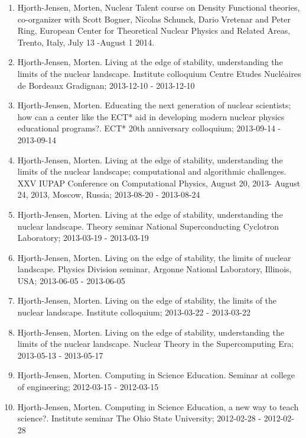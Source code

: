 \documentclass[%
oneside,                 %
final,                   %
10pt]{article}
\begin{document}
\begin{enumerate}
\item Hjorth-Jensen, Morten, Nuclear Talent course on Density Functional theories, co-organizer with Scott Bogner, Nicolas Schunck, Dario Vretenar and Peter Ring, European Center for Theoretical Nuclear Physics and Related Areas, Trento, Italy, July 13 -August 1 2014.

\item Hjorth-Jensen, Morten.  Living at the edge of stability, understanding the limits of the nuclear landscape. Institute colloquium Centre Etudes Nucléaires de Bordeaux Gradignan; 2013-12-10 - 2013-12-10

\item Hjorth-Jensen, Morten.  Educating the next generation of nuclear scientists; how can a center like the ECT* aid in developing modern nuclear physics educational programs?. ECT* 20th anniversary colloquium; 2013-09-14 - 2013-09-14

\item Hjorth-Jensen, Morten.  Living at the edge of stability, understanding the limits of the nuclear landscape; computational and algorithmic challenges. XXV IUPAP Conference on Computational Physics, August 20, 2013- August 24, 2013, Moscow, Russia; 2013-08-20 - 2013-08-24

\item Hjorth-Jensen, Morten.  Living at the edge of stability, understanding the nuclear landscape. Theory seminar National Superconducting Cyclotron Laboratory; 2013-03-19 - 2013-03-19

\item Hjorth-Jensen, Morten.  Living on the edge of stability, the limits of nuclear landscape. Physics Division seminar, Argonne National Laboratory, Illinois, USA; 2013-06-05 - 2013-06-05

\item Hjorth-Jensen, Morten.  Living on the edge of stability, the limits of the nuclear landscape. Institute colloquium; 2013-03-22 - 2013-03-22

\item Hjorth-Jensen, Morten.  Living on the edge of stability, understanding the limits of the nuclear landscape. Nuclear Theory in the Supercomputing Era; 2013-05-13 - 2013-05-17

\item Hjorth-Jensen, Morten.  Computing in Science Education. Seminar at college of engineering; 2012-03-15 - 2012-03-15

\item Hjorth-Jensen, Morten.  Computing in Science Education, a new way to teach science?. Institute seminar The Ohio State University; 2012-02-28 - 2012-02-28


\end{enumerate}
\end{document}
